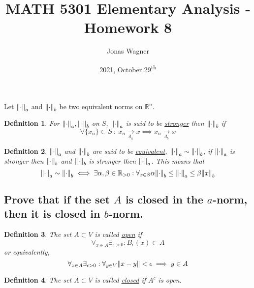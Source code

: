 \documentclass[]{article}
\title{MATH 5301 Elementary Analysis - Homework 8}
\author{Jonas Wagner}
\date{2021, October 29\textsuperscript{th}}
\newcommand{\R}{\mathbb{R}}
\newcommand{\st}{\ : \ }
\newtheorem{definition}{Definition}
\begin{document}
\maketitle

\section{}
Let $\norm{\cdot}_a$ and $\norm{\cdot}_b$ be two equivalent norms on $\R^n$.
\begin{definition}
    For $\norm{\cdot}_a, \norm{\cdot}_b$ on $S$, 
    $\norm{\cdot}_a$ is said to be \underline{stronger} then $\norm{\cdot}_b$ if 
    \[
        \forall \{x_n\} \subset S \st x_n \xrightarrow[d_a]{} x \implies x_n \xrightarrow[d_b]{} x
    \]
\end{definition}
\begin{definition}
    $\norm{\cdot}_a$ and $\norm{\cdot}_b$ are said to be \underline{equivalent},  $\norm{\cdot}_a \sim \norm{\cdot}_b$,
    if $\norm{\cdot}_a$ is stronger then $\norm{\cdot}_b$ 
    and $\norm{\cdot}_b$ is stronger then $\norm{\cdot}_a$. 
    This means that
    \[
        \norm{\cdot}_a \sim \norm{\cdot}_b 
            \iff \exists{\alpha,\beta \in \R_{>0}} : 
            \forall_{x\in S} \alpha \norm{\cdot}_b \leq \norm{\cdot}_a \leq \beta \norm{x}_b
    \]
\end{definition}

\subsection{Prove that if the set $A$ is closed in the $a$-norm, then it is closed in $b$-norm.}

\begin{definition}
    The set $A \subset V$ is called \underline{open} if 
    $$\forall_{x\in A} \exists_{\epsilon>0} : B_\epsilon(x)\subset A$$
    or equivalently,
    \[\forall_{x \in A} \exists_{\epsilon>0} : \forall_{y \in V}\norm{x - y} < \epsilon \implies y \in A\]
\end{definition}
\begin{definition}
    The set $A \subset V$ is called \underline{closed} if $A^c$ is open.
\end{definition}
\end{document}
